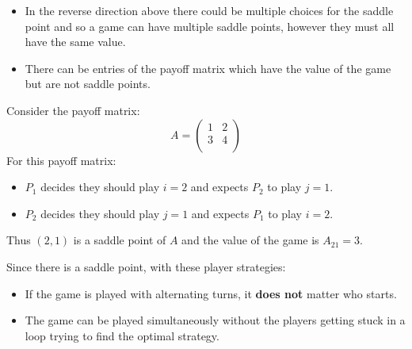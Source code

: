 \documentclass[../main.tex]{subfiles}
\begin{document}
\begin{remark}[Remarks]
  \begin{itemize}
    \item In the reverse direction above there could be multiple choices for the saddle point and so a game can have multiple saddle points, however they must all have the same value.
    \item There can be entries of the payoff matrix which have the value of the game but are not saddle points.
  \end{itemize}
\end{remark}
\begin{example}
  Consider the payoff matrix:
  \[
    A = \begin{pmatrix}
    1 & 2 \\
    3 & 4 \\
    \end{pmatrix}
  \]
  For this payoff matrix:
  \begin{itemize}
    \item $P_1$ decides they should play $i = 2$ and expects $P_2$ to play $j = 1$.
    \item $P_2$ decides they should play $j = 1$ and expects $P_1$ to play $i = 2$.
  \end{itemize}
  Thus $(2, 1)$ is a saddle point of $A$ and the value of the game is $A_{2 1} = 3$.

  Since there is a saddle point, with these player strategies:
  \begin{itemize}
    \item If the game is played with alternating turns, it \textbf{does not} matter who starts.
    \item The game can be played simultaneously without the players getting stuck in a loop trying to find the optimal strategy.
  \end{itemize}
\end{example}
\end{document}

